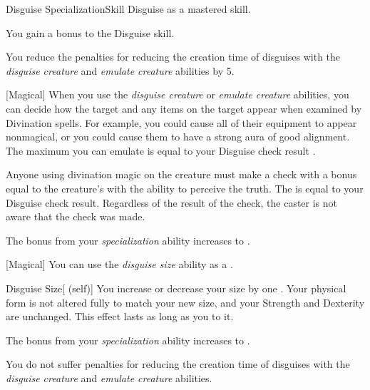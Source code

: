     \begin{feat}{Disguise Specialization}{Skill}
        \featpre Disguise as a mastered skill.

         You gain a  bonus to the Disguise skill.

         You reduce the penalties for reducing the creation time of disguises with the \textit{disguise creature} and \textit{emulate creature} abilities by 5.

        [Magical] When you use the \textit{disguise creature} or \textit{emulate creature} abilities, you can decide how the target and any items on the target appear when examined by Divination spells.
        For example, you could cause all of their equipment to appear nonmagical, or you could cause them to have a strong aura of good alignment.
        The maximum  you can emulate is equal to your Disguise check result .

        Anyone using divination magic on the creature must make a check with a bonus equal to the creature's  with the ability to perceive the truth.
        The  is equal to your Disguise check result.
        Regardless of the result of the check, the caster is not aware that the check was made.

         The bonus from your \textit{specialization} ability increases to .

        [Magical] You can use the \textit{disguise size} ability as a .
        \begin{attuneability}{Disguise Size}[ (self)]
            You increase or decrease your size by one .
            Your physical form is not altered fully to match your new size, and your Strength and Dexterity are unchanged.
            This effect lasts as long as you  to it.
        \end{attuneability}

         The bonus from your \textit{specialization} ability increases to .

         You do not suffer penalties for reducing the creation time of disguises with the \textit{disguise creature} and \textit{emulate creature} abilities.
    \end{feat}

